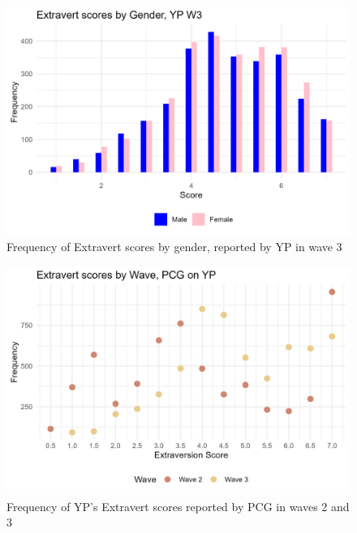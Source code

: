 \documentclass[a4paper]{article}
\begin{document}
\begin{figure}[htbp] 
    \centering
    \includegraphics[width=1\linewidth]{Frequency of Extravert by Gender.jpeg}
    \caption{Frequency of Extravert scores by gender, reported by YP in wave 3}
    \label{}
\end{figure}

\begin{figure}[htbp] 
    \centering
    \includegraphics[width=1\linewidth]{Frequency of Extravert by Wave, PCG.jpeg}
    \caption{Frequency of YP's Extravert scores reported by PCG in waves 2 and 3}
    \label{}
\end{figure}
\end{document}
